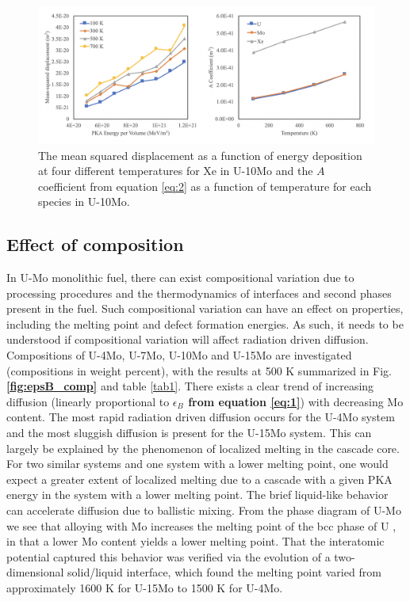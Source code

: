 \documentclass[review]{elsarticle}
\providecommand{\DIFaddtex}[1]{{\bf #1}} %
\providecommand{\DIFdeltex}[1]{} %
\providecommand{\DIFaddbegin}{\protect\color{blue}} %
\providecommand{\DIFaddend}{\protect\color{black}} %
\providecommand{\DIFdelbegin}{\protect\color{red}} %
\providecommand{\DIFdelend}{\protect\color{black}} %
\providecommand{\DIFadd}[1]{\texorpdfstring{\DIFaddtex{#1}}{#1}} %
\providecommand{\DIFdel}[1]{\texorpdfstring{\DIFdeltex{#1}}{}} %
\newcommand{\DIFscaledelfig}{0.5}
\newlength{\DIFdelgraphicswidth} %
\newlength{\DIFdelgraphicsheight} %
\newcommand{\DIFaddincludegraphics}[2][]{{\color{blue}\fbox{\DIFOincludegraphics[#1]{#2}}}} %
\newcommand{\DIFdelincludegraphics}[2][]{%
\sbox{\DIFdelgraphicsbox}{\DIFOincludegraphics[#1]{#2}}%
\settoboxwidth{\DIFdelgraphicswidth}{\DIFdelgraphicsbox} %
\settoboxtotalheight{\DIFdelgraphicsheight}{\DIFdelgraphicsbox} %
\scalebox{\DIFscaledelfig}{%
\parbox[b]{\DIFdelgraphicswidth}{\usebox{\DIFdelgraphicsbox}\\[-\baselineskip] \rule{\DIFdelgraphicswidth}{0em}}\llap{\resizebox{\DIFdelgraphicswidth}{\DIFdelgraphicsheight}{%
\setlength{\unitlength}{\DIFdelgraphicswidth}%
\begin{picture}(1,1)%
\thicklines\linethickness{2pt} %
{\color[rgb]{1,0,0}\put(0,0){\framebox(1,1){}}}%
{\color[rgb]{1,0,0}\put(0,0){\line( 1,1){1}}}%
{\color[rgb]{1,0,0}\put(0,1){\line(1,-1){1}}}%
\end{picture}%
}\hspace*{3pt}}} %
} %
\DeclareRobustCommand{\DIFaddbegin}{\DIFOaddbegin \let\includegraphics\DIFaddincludegraphics} %
\DeclareRobustCommand{\DIFaddend}{\DIFOaddend \let\includegraphics\DIFOincludegraphics} %
\DeclareRobustCommand{\DIFdelbegin}{\DIFOdelbegin \let\includegraphics\DIFdelincludegraphics} %
\DeclareRobustCommand{\DIFdelend}{\DIFOaddend \let\includegraphics\DIFOincludegraphics} %
\begin{document}
\begin{figure}[h]
 \centering
 \includegraphics[width=1.0\textwidth]{6_msdT.png} 
 \caption{The mean squared displacement as a function of energy deposition at four different temperatures for Xe in U-10Mo and the $A$ coefficient from equation \ref{eq:2} as a function of temperature for each species in U-10Mo. }
 \label{fig:msdT}
\end{figure}

\FloatBarrier

\subsection{Effect of composition}

In U-Mo monolithic fuel, there can exist compositional variation due to processing procedures and the thermodynamics of interfaces and second phases present in the fuel. Such compositional variation can have an effect on properties, including the melting point and defect formation energies. As such, it needs to be understood if compositional variation will affect radiation driven diffusion. Compositions of U-4Mo, U-7Mo, U-10Mo and U-15Mo are investigated (compositions in weight percent), with the results at 500 K summarized in Fig. \DIFdelbegin \DIFdel{\ref{fig:A_comp} }\DIFdelend \DIFaddbegin \DIFadd{\ref{fig:epsB_comp} }\DIFaddend and table \ref{tab1}. There exists a clear trend of increasing diffusion (linearly proportional to \DIFdelbegin \DIFdel{$A$ from equation \ref{eq:2}}\DIFdelend \DIFaddbegin \DIFadd{$\epsilon_B$ from equation \ref{eq:1}}\DIFaddend ) with decreasing Mo content. The most rapid radiation driven diffusion occurs for the U-4Mo system and the most sluggish diffusion is present for the U-15Mo system. This can largely be explained by the phenomenon of localized melting in the cascade core. For two similar systems and one system with a lower melting point, one would expect a greater extent of localized melting due to a cascade with a given PKA energy in the system with a lower melting point. The brief liquid-like behavior can accelerate diffusion due to ballistic mixing. From the phase diagram of U-Mo we see that alloying with Mo increases the melting point of the bcc phase of U \cite{umo_handbook}, in that a lower Mo content yields a lower melting point. That the interatomic potential captured this behavior was verified via the evolution of a two-dimensional solid/liquid interface, which found the melting point varied from approximately 1600 K for U-15Mo to 1500 K for U-4Mo. 
\DIFaddbegin 
\end{document}
